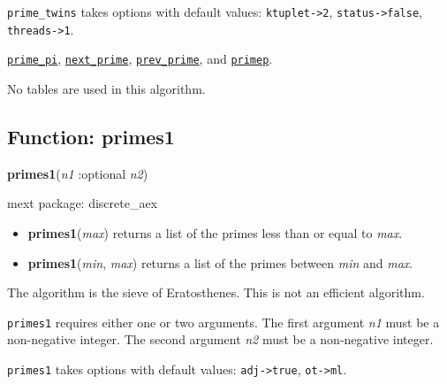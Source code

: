\documentclass[]{article}
\begin{document}
\vspace{5 pt}

{\tt prime\_twins} takes options with default values: {\tt ktuplet->2}, {\tt status->false}, {\tt threads->1}.
\vspace{5 pt}


  \hyperlink{prime_pi}{{\tt prime\_pi}}, \hyperlink{next_prime}{{\tt next\_prime}}, \hyperlink{prev_prime}{{\tt prev\_prime}}, and \hyperlink{primep}{{\tt primep}}.

\vspace{5 pt}


No tables are used in this algorithm. 

\vspace{5 pt}


\subsection{Function: primes1\label{sec:primes1}}
\hypertarget{primes1}{}
{\bf primes1}({\it n1} :optional {\it n2})


\noindent mext package: discrete\_aex



\vspace{5 pt}
\begin{itemize}
\item[] {\bf primes1}({\it max})
  returns a list of the primes less than or equal to {\it max}. 

\item[] {\bf primes1}({\it min}, {\it max})
  returns a list of the primes between {\it min} and {\it max}. 

\end{itemize}
The algorithm is the sieve of Eratosthenes. This is not an efficient algorithm. 

\vspace{5 pt}

   {\tt primes1} requires either one or two arguments.
    The first argument {\it n1} must be a non-negative integer.
    The second argument {\it n2} must be a non-negative integer.


\vspace{5 pt}

{\tt primes1} takes options with default values: {\tt adj->true}, {\tt ot->ml}.
\vspace{5 pt}
\end{document}
